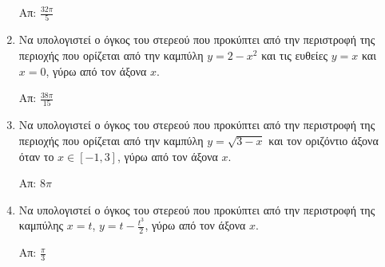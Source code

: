 \begin{enumerate}
   \hfill Απ: $\frac{32\pi}{5}$

   \item  Να υπολογιστεί ο όγκος του στερεού που προκύπτει από την περιστροφή της περιοχής που ορίζεται από την καμπύλη $y=2-x^{2}$ και τις ευθείες $y=x$ και $x=0$, γύρω από τον άξονα $x$.

   \hfill Απ: $\frac{38\pi}{15}$

   \item  Να υπολογιστεί ο όγκος του στερεού που προκύπτει από την περιστροφή της περιοχής που ορίζεται από την καμπύλη $y=\sqrt{3-x}$ και τον οριζόντιο άξονα όταν το $x\in [-1,3]$, γύρω από τον άξονα $x$.

   \hfill Απ: $8\pi$

   \item Να υπολογιστεί ο όγκος του στερεού που προκύπτει από την περιστροφή της καμπύλης $x=t$, $y=t-\frac{t^{3}}{2}$, γύρω από τον άξονα $x$.

   \hfill Απ: $\frac{\pi}{3}$





\end{enumerate}


